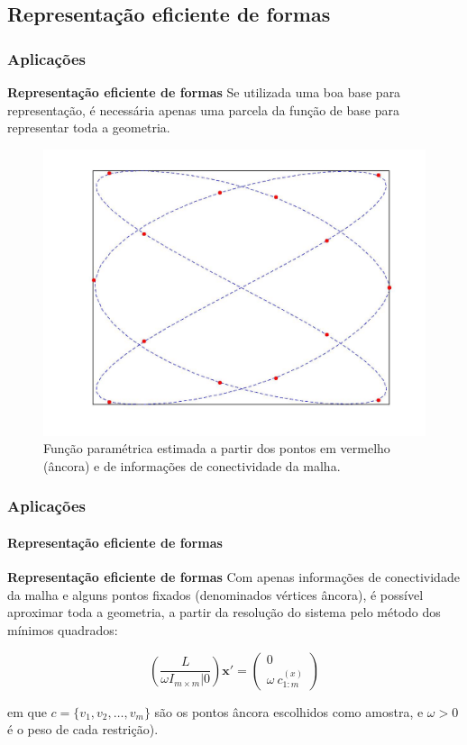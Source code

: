 \subsection{Representação eficiente de formas}

\begin{frame}
\frametitle{{\bf \color{blue} Aplicações}}
	
\begin{block}{\bf Representação eficiente de formas}
Se utilizada uma boa base para representação, é necessária apenas uma parcela da função de base para representar toda a geometria.
\end{block}

\begin{center}
	\begin{figure}
	\includegraphics[trim={4cm, 3cm, 4cm, 2cm},clip,width=0.4\linewidth]{imagens/rep_dashed.jpg}
	\caption{Função paramétrica estimada a partir dos pontos em vermelho (âncora) e de informações de conectividade da malha.}
	\end{figure}
\end{center}
	
\end{frame}

\begin{frame}
\frametitle{{\bf \color{blue} Aplicações}}
\framesubtitle{\color{blue} Representação eficiente de formas}
	
	\begin{block}{\bf Representação eficiente de formas}
		Com apenas informações de conectividade da malha e alguns pontos fixados (denominados vértices âncora), é possível aproximar toda a geometria, a partir da resolução do sistema pelo método dos mínimos quadrados:
		
		\begin{equation}\label{eq:sisrecover}
			\left( \frac{L}{\omega I_{m \times m} | 0} \right) \mathbf{x'} = \begin{pmatrix}
				0\\
				\omega\ c_{1:m}^{(x)}
			\end{pmatrix}
		\end{equation}
		
		em que $c = \{v_1, v_2, \dots, v_m\}$ são os pontos âncora escolhidos como amostra, e $\omega > 0$ é o peso de cada restrição).
	\end{block}
	
\end{frame}

